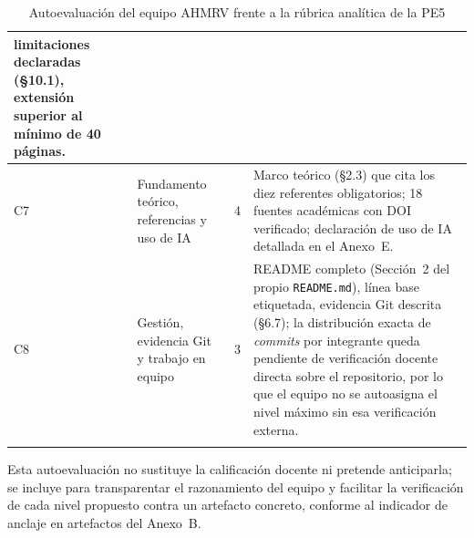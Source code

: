 \documentclass[11pt,a4paper]{article}
\begin{document}
\begin{longtable}{|C{1.0cm}|L{3.6cm}|C{1.3cm}|L{6.6cm}|}
limitaciones declaradas (\S 10.1), extensión superior al mínimo de 40 páginas. \\ \hline
C7 & Fundamento teórico, referencias y uso de IA & 4 & Marco teórico (\S 2.3) que cita los diez
referentes obligatorios; 18 fuentes académicas con DOI verificado; declaración de uso de IA
detallada en el Anexo~E. \\ \hline
C8 & Gestión, evidencia Git y trabajo en equipo & 3 & README completo (Sección~2 del propio
\texttt{README.md}), línea base etiquetada, evidencia Git descrita (\S 6.7); la distribución exacta
de \emph{commits} por integrante queda pendiente de verificación docente directa sobre el
repositorio, por lo que el equipo no se autoasigna el nivel máximo sin esa verificación externa.
\\ \hline
\caption{Autoevaluación del equipo AHMRV frente a la rúbrica analítica de la PE5}
\end{longtable}

\noindent\small Esta autoevaluación no sustituye la calificación docente ni pretende anticiparla;
se incluye para transparentar el razonamiento del equipo y facilitar la verificación de cada nivel
propuesto contra un artefacto concreto, conforme al indicador de anclaje en artefactos del Anexo~B.
\end{document}
